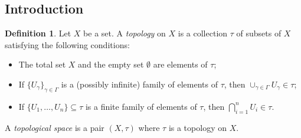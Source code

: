 \documentclass[12pt, reqno]{amsart}
\theoremstyle{definition}
\newtheorem{definition}[theorem]{Definition}
\numberwithin{equation}{section}
\begin{document}
\subsection{Introduction}
\begin{definition}
    Let $X$ be a set. A \textit{topology} on $X$ is a collection $\tau$ of subsets of $X$ satisfying the following conditions:
    \begin{itemize}
        \item The total set $X$ and the empty set $\emptyset$ are elements of $\tau$;
        \item If $\{U_\gamma\}_{\gamma \in \Gamma}$ is a (possibly infinite) family of elements of $\tau$, then $\cup_{\gamma \in \Gamma}U_\gamma \in \tau$;
        \item If $\{U_1, \dots, U_n\} \subseteq \tau$ is a finite family of elements of $\tau$, then $\bigcap_{i=1}^n U_i \in \tau$.
    \end{itemize}
    A \textit{topological space} is a pair $(X, \tau)$ where $\tau$ is a topology on $X$.
\end{definition}
\end{document}
